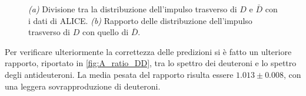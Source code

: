 \begin{figure}[htb]
\begin{subfigure}{.49\textwidth}
        \caption{}
        \label{fig:A_ratio_DD}
    \end{subfigure}
    \caption{\emph{\rmfamily (a)} Divisione tra la distribuzione dell'impulso trasverso di $D$ e $\bar D$ con i dati di ALICE. \emph{\rmfamily (b)} Rapporto delle distribuzione dell'impulso trasverso di $D$ con quello di $\bar D$.}
    \label{fig:A_ratio_DD_}
\end{figure}

Per verificare ulteriormente la correttezza delle predizioni si è fatto un ulteriore rapporto, riportato in \autoref{fig:A_ratio_DD}, tra lo spettro dei deuteroni e lo spettro degli antideuteroni.
La media pesata del rapporto risulta essere $1.013 \pm 0.008$, con una leggera sovrapproduzione di deuteroni.